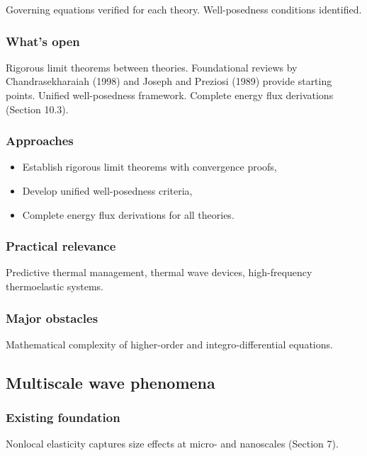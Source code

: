Governing equations verified for each theory. Well-posedness conditions identified.

\subsubsection{What's open}

Rigorous limit theorems between theories. Foundational reviews by Chandrasekharaiah (1998) \cite{Chandrasekharaiah1998} and Joseph and Preziosi (1989) \cite{Joseph1989} provide starting points. Unified well-posedness framework. Complete energy flux derivations (Section 10.3).

\subsubsection{Approaches}

\begin{itemize}
\item Establish rigorous limit theorems with convergence proofs,
\item Develop unified well-posedness criteria,
\item Complete energy flux derivations for all theories.
\end{itemize}

\subsubsection{Practical relevance}

Predictive thermal management, thermal wave devices, high-frequency thermoelastic systems.

\subsubsection{Major obstacles}

Mathematical complexity of higher-order and integro-differential equations.

\subsection{Multiscale wave phenomena}
\label{sec:16.3}

\subsubsection{Existing foundation}

Nonlocal elasticity captures size effects at micro- and nanoscales (Section 7).

